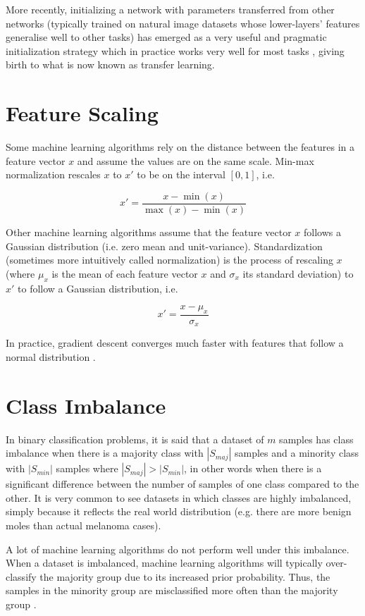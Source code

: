 More recently, initializing a network with parameters transferred from other networks (typically trained on natural image datasets whose lower-layers' features generalise well to other tasks) has emerged as a very useful and pragmatic initialization strategy which in practice works very well for most tasks \cite{howtransferable}, giving birth to what is now known as transfer learning.

\section{Feature Scaling}

Some machine learning algorithms rely on the distance between the features in a feature vector $x$ and assume the values are on the same scale. Min-max normalization rescales $x$ to $x'$ to be on the interval $[0, 1]$, i.e.

$$
x' = \frac{x - \min{(x)}}{\max{(x)} - \min{(x)}}
$$

Other machine learning algorithms assume that the feature vector $x$ follows a Gaussian distribution (i.e. zero mean and unit-variance). Standardization (sometimes more intuitively called normalization) is the process of rescaling $x$ (where $\mu_x$ is the mean of each feature vector $x$ and $\sigma_x$ its standard deviation) to $x'$ to follow a Gaussian distribution, i.e.

$$
x' = \frac{x - \mu_x}{\sigma_x}
$$

In practice, gradient descent converges much faster with features that follow a normal distribution \cite{batchnormalization}.

\section{Class Imbalance}
\label{subsection:classimbalance}

In binary classification problems, it is said that a dataset of $m$ samples has class imbalance when there is a majority class with $|S_{maj}|$ samples and a minority class with $|S_{min}|$ samples where $|S_{maj}| > |S_{min}|$, in other words when there is a significant difference between the number of samples of one class compared to the other. It is very common to see datasets in which classes are highly imbalanced, simply because it reflects the real world distribution (e.g. there are more benign moles than actual melanoma cases).

A lot of machine learning algorithms do not perform well under this imbalance. When a dataset is imbalanced, machine learning algorithms will typically over-classify the majority group due to its increased prior probability. Thus, the samples in the minority group are misclassified more often than the majority group \cite{Johnson2019}.


